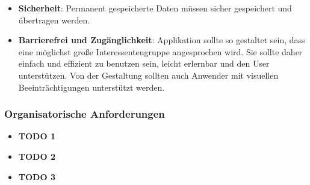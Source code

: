 \begin{itemize}
   \item
   \textbf{Sicherheit}: Permanent gespeicherte Daten müssen sicher gespeichert und übertragen werden. 

   \item
   \textbf{Barrierefrei und Zugänglichkeit}: Applikation sollte so gestaltet sein, dass eine möglichst große Interessentengruppe angesprochen wird. Sie sollte daher einfach und effizient zu benutzen sein, leicht erlernbar und den User unterstützen. Von der  Gestaltung sollten auch Anwender mit visuellen Beeinträchtigungen unterstützt werden.
\end{itemize}



\subsubsection{Organisatorische Anforderungen}          
\begin{itemize}
   \item
   \textbf{TODO 1}

   \item 
   \textbf{TODO 2}

   \item
   \textbf{TODO 3}

\end{itemize}

